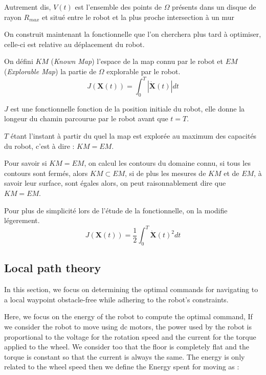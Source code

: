 \documentclass[../main.tex]{subfiles}
\begin{document}
Autrement dis, $V(t)$ est l'ensemble des points de $\Omega$ présents dans un disque de rayon $R_{max}$ et situé entre le robot et la plus proche intersection à un mur 

On construit maintenant la fonctionnelle que l'on cherchera plus tard à optimiser, celle-ci est relative au déplacement du robot.


On défini $\mathit{KM}$ (\textit{Known Map}) l'espace de la map connu par le robot et $\mathit{EM}$ (\textit{Explorable Map}) la partie de $\Omega$ explorable par le robot.
\begin{equation}
    \displaystyle
    J(\mathbf{X}(t)) = \int_{0}^{T} | \mathbf{\dot{X}}(t) | dt
\end{equation}

$J$ est une fonctionnelle fonction de la position initiale du robot, elle donne la longeur du chamin parcourue par le robot avant que $t = T$.

$T$ étant l'instant à partir du quel la map est explorée au maximum des capacités du robot, c'est à dire : $KM = EM$.

Pour savoir si $KM = EM$, on calcul les contours du domaine connu, si tous les contours sont fermés, alors $KM \subset EM$, si de plus les mesures de $KM$ et de $EM$, à savoir leur surface, sont égales alors, on peut raisonnablement dire que $KM = EM$.


Pour plus de simplicité lors de l'étude de la fonctionnelle, on la modifie légerement.
\begin{equation}
    \displaystyle
    J(\mathbf{X}(t)) = \frac{1}{2} \int_{0}^{T} \mathbf{\dot{X}}(t)^{2} dt
\end{equation}

\subsection{Local path theory}

In this section, we focus on determining the optimal commands for navigating to a local waypoint obstacle-free while adhering to the robot's constraints.

Here, we focus on the energy of the robot to compute the optimal command, If we consider the robot to move using dc motors, the power used by the robot is proportional to the voltage for the rotation speed and the current for the torque applied to the wheel. We consider too that the floor is completely flat and the torque is constant so that the current is always the same. The energy is only related to the wheel speed then we define the Energy spent for moving as :
\end{document}
